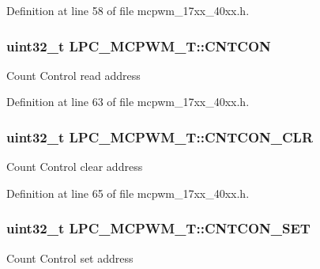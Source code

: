 Definition at line 58 of file mcpwm\+\_\+17xx\+\_\+40xx.\+h.

\subsubsection[{\texorpdfstring{C\+N\+T\+C\+ON}{CNTCON}}]{ uint32\+\_\+t L\+P\+C\+\_\+\+M\+C\+P\+W\+M\+\_\+\+T\+::\+C\+N\+T\+C\+ON}\hypertarget{structLPC__MCPWM__T_a7a400f1cfa5c66f9546a2df92acf0402}{}\label{structLPC__MCPWM__T_a7a400f1cfa5c66f9546a2df92acf0402}
Count Control read address 

Definition at line 63 of file mcpwm\+\_\+17xx\+\_\+40xx.\+h.

\subsubsection[{\texorpdfstring{C\+N\+T\+C\+O\+N\+\_\+\+C\+LR}{CNTCON_CLR}}]{ uint32\+\_\+t L\+P\+C\+\_\+\+M\+C\+P\+W\+M\+\_\+\+T\+::\+C\+N\+T\+C\+O\+N\+\_\+\+C\+LR}\hypertarget{structLPC__MCPWM__T_a1130e338a71c6ee3a1c92084ced3aecd}{}\label{structLPC__MCPWM__T_a1130e338a71c6ee3a1c92084ced3aecd}
Count Control clear address 

Definition at line 65 of file mcpwm\+\_\+17xx\+\_\+40xx.\+h.

\subsubsection[{\texorpdfstring{C\+N\+T\+C\+O\+N\+\_\+\+S\+ET}{CNTCON_SET}}]{ uint32\+\_\+t L\+P\+C\+\_\+\+M\+C\+P\+W\+M\+\_\+\+T\+::\+C\+N\+T\+C\+O\+N\+\_\+\+S\+ET}\hypertarget{structLPC__MCPWM__T_a726084d7661d7fc8bb579fef4ed5727f}{}\label{structLPC__MCPWM__T_a726084d7661d7fc8bb579fef4ed5727f}
Count Control set address 

